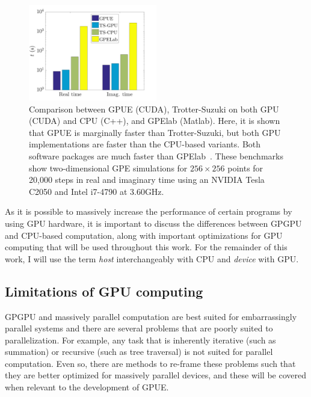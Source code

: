 \begin{figure}
\center \includegraphics[width=0.5\textwidth]{data/gpu/GPUEvsTS.png}
\caption{Comparison between GPUE (CUDA), Trotter-Suzuki on both GPU (CUDA) and CPU (C++), and GPElab (Matlab).
Here, it is shown that GPUE is marginally faster than Trotter-Suzuki, but both GPU implementations are faster than the CPU-based variants.
Both software packages are much faster than GPElab~\cite{wittek2016}.
These benchmarks show two-dimensional GPE simulations for $256 \times 256$ points for 20,000 steps in real and imaginary time using an NVIDIA Tesla C2050 and Intel i7-4790 at 3.60GHz.}
\label{fig:bench}
\end{figure}

As it is possible to massively increase the performance of certain programs by using GPU hardware, it is important to discuss the differences between GPGPU and CPU-based computation, along with important optimizations for GPU computing that will be used throughout this work.
For the remainder of this work, I will use the term \textit{host} interchangeably with CPU and \textit{device} with GPU.

\subsection{Limitations of GPU computing}

GPGPU and massively parallel computation are best suited for embarrassingly parallel systems and there are several problems that are poorly suited to parallelization.
For example, any task that is inherently iterative (such as summation) or recursive (such as tree traversal) is not suited for parallel computation.
Even so, there are methods to re-frame these problems such that they are better optimized for massively parallel devices, and these will be covered when relevant to the development of GPUE.

